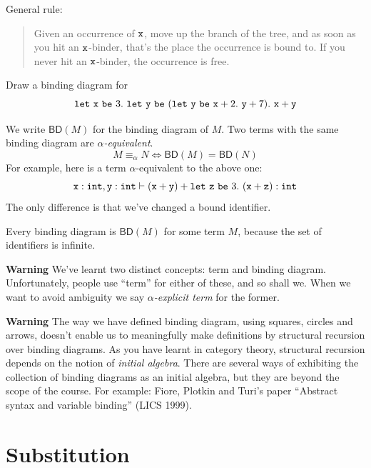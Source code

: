 \documentclass[runningheads,12pt]{llncs}
\newcommand{\ttletmac}[2]{\mathtt{let}\ {#2}\ \mathtt{be}\ {#1}.\ }
\newcommand{\bd}[1]{\mathsf{BD}({#1})}
\begin{document}
General rule:
\begin{quotation}
Given an occurrence of $\mathtt{x}$, move up the branch of the tree, and as soon as you hit an $\mathtt{x}$-binder, that's the place the occurrence is bound to.  If you never hit an $\mathtt{x}$-binder, the occurrence is free.
\end{quotation}

\begin{exercise}
  Draw a binding diagram for
  \begin{displaymath}
    \ttletmac{ 3 }{ \ttx } 
 \ttletmac{ (\ttletmac { \ttx+2 }{ \tty } \tty+7) }{ \tty } 
 \ttx + \tty
  \end{displaymath}
\end{exercise}
We write $\bd{M}$ for the binding diagram of $M$.  Two terms with the same binding diagram are \emph{$\alpha$-equivalent}.
\begin{displaymath}
  M \equiv_{\alpha} N \iff \bd{M} = \bd{N}
\end{displaymath}
For example, here is a term $\alpha$-equivalent to the above one:
\begin{displaymath}
  \ttx: \ttint, \tty: \ttint \vdash  (\ttx + \tty) + \ttletmac{ 3 }{ \ttz } (\ttx + \ttz) : \ttint
\end{displaymath}
The only difference is that we've changed a bound identifier.  

Every binding diagram is $\bd{M}$ for some term $M$, because the set of identifiers is infinite.

{\bf Warning} We've learnt two distinct concepts: term and binding diagram.  Unfortunately, people use ``term'' for either of these, and so shall we.   When we want to avoid ambiguity we say \emph{$\alpha$-explicit term} for the former.

{\bf Warning} The way we have defined binding diagram, using squares, circles and arrows, doesn't enable us to meaningfully make definitions by structural recursion over binding diagrams.  As you have learnt in category theory, structural recursion depends on the notion of \emph{initial algebra}.  There are several ways of exhibiting the collection of binding diagrams as an initial algebra, but they are beyond the scope of the course.  For example: Fiore, Plotkin and Turi's paper ``Abstract syntax and variable binding'' (LICS 1999). 





\section{Substitution}
\end{document}
